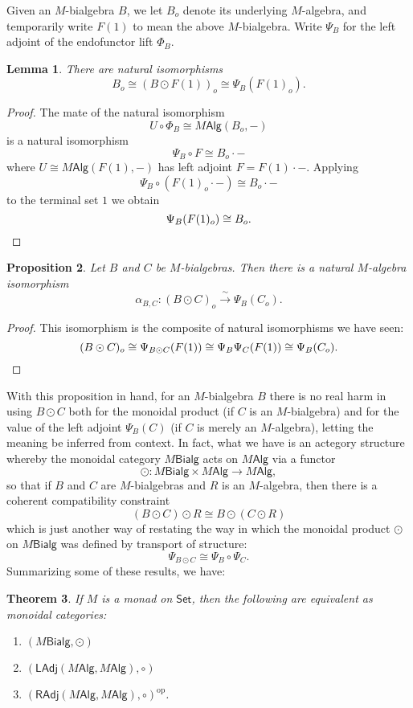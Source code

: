 \documentclass[12pt,reqno]{amsart}
\theoremstyle{plain}
\newtheorem{thm}{Theorem}
\newtheorem{prop}[thm]{Proposition}
\newtheorem{lem}[thm]{Lemma}
\theoremstyle{definition}
\theoremstyle{remark}
\newcommand{\maps}{\colon}
\newcommand{\op}{^\mathrm{op}}
\newcommand{\namedcat}[1]{\mathsf{#1}}
\newcommand{\Alg}{\namedcat{Alg}}
\newcommand{\Bialg}{\namedcat{Bialg}}
\newcommand{\LAdj}{\namedcat{LAdj}}
\newcommand{\RAdj}{\namedcat{RAdj}}
\newcommand{\Set}{\namedcat{Set}}
\numberwithin{thm}{section}
\begin{document}
Given an $M$-bialgebra $B$, we let $B_o$ denote its underlying $M$-algebra, and temporarily write $F(1)$ to mean the above $M$-bialgebra. Write $\Psi_B$ for the left adjoint of the endofunctor lift $\Phi_B$. 

\begin{lem}
   There are natural isomorphisms 
    \[  B_o \cong (B \odot  F(1))_o \cong \Psi_B(F(1)_o) .\]
\end{lem}

\begin{proof}
\label{lem:isomorphisms}
    The mate of the natural isomorphism
    \[U \circ \Phi_B \cong M\Alg(B_o, -)\]
    is a natural isomorphism 
    \[\Psi_B \circ F \cong B_o \cdot -\]
    where $U \cong M\Alg( F(1), -)$ has left adjoint $F= F(1) \cdot -$. Applying
    \[\Psi_B \circ ( F(1)_o \cdot -) \cong B_o \cdot - \]
    to the terminal set $1$ we obtain
    \[\Psi_B( F(1)_o) \cong B_o.\qedhere\]
\end{proof}

\begin{prop}
\label{prop:odot}
    Let $B$ and $C$ be $M$-bialgebras. Then there is a natural $M$-algebra isomorphism 
    \[ \alpha_{B,C} \maps (B \odot C)_o \xrightarrow{\,\sim\,} \Psi_B(C_o) .\]
\end{prop}
\begin{proof}
    This isomorphism is the composite of natural isomorphisms we have seen:
    \[
        (B \odot C)_o \cong \Psi_{B \odot C}( F(1)) \cong \Psi_B \Psi_C( F(1)) \cong \Psi_B(C_o) .\qedhere 
    \]
\end{proof}

With this proposition in hand, for an $M$-bialgebra $B$ there is no real harm in using $B \odot C$ both for the monoidal product (if $C$ is an $M$-bialgebra) and for the value of the left adjoint $\Psi_B(C)$ (if $C$ is merely an $M$-algebra), letting the meaning be inferred from context. In fact, what we have is an actegory structure whereby the monoidal category $M\Bialg$ acts on $M\Alg$ via a functor
\[
\odot \maps M\Bialg \times M\Alg \to M\Alg, 
\] 
so that if $B$ and $C$ are $M$-bialgebras and $R$ is an $M$-algebra, then there is a coherent compatibility constraint 
\[
(B \odot C) \odot R \cong B \odot (C \odot R)
\]
which is just another way of restating the way in which the monoidal product $\odot$ on $M\Bialg$ was defined by transport of structure: 
\[ 
\Psi_{B \odot C} \cong \Psi_B \circ \Psi_C.
\]
Summarizing some of these results, we have:

\begin{thm}
\label{thm:MBialg}
    If $M$ is a monad on $\Set$, then the following are equivalent as monoidal categories:
    \begin{enumerate}
        \item $(M\Bialg, \odot)$
        \item $(\LAdj(M\Alg, M\Alg), \circ)$
        \item $(\RAdj(M\Alg,M\Alg), \circ)\op$.
    \end{enumerate}
\end{thm}
\end{document}
